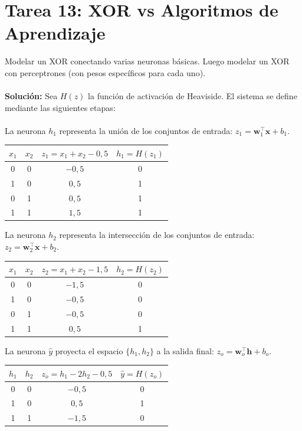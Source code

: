 \documentclass{article}
\begin{document}
\section{Tarea 13: XOR vs Algoritmos de Aprendizaje}
\noindent Modelar un XOR conectando varias neuronas básicas. Luego modelar un XOR con perceptrones (con pesos específicos para cada uno). \\ \\
\textbf{Solución:} Sea $H(z)$ la función de activación de Heaviside. El sistema se define mediante las siguientes etapas: \\ \\
La neurona $h_1$ representa la unión de los conjuntos de entrada: $z_1 = \mathbf{w}_1^\top \mathbf{x} + b_1$.
\begin{center}
\begin{tabular}{cccc}
\toprule
$x_1$ & $x_2$ & $z_1 = x_1 + x_2 - 0,5$ & $h_1 = H(z_1)$ \\
\midrule
0 & 0 & $-0,5$ & 0 \\
1 & 0 & $0,5$  & 1 \\
0 & 1 & $0,5$  & 1 \\
1 & 1 & $1,5$  & 1 \\
\bottomrule
\end{tabular}
\end{center}
La neurona $h_2$ representa la intersección de los conjuntos de entrada: $z_2 = \mathbf{w}_2^\top \mathbf{x} + b_2$.
\begin{center}
\begin{tabular}{cccc}
\toprule
$x_1$ & $x_2$ & $z_2 = x_1 + x_2 - 1,5$ & $h_2 = H(z_2)$ \\
\midrule
0 & 0 & $-1,5$ & 0 \\
1 & 0 & $-0,5$ & 0 \\
0 & 1 & $-0,5$ & 0 \\
1 & 1 & $0,5$  & 1 \\
\bottomrule
\end{tabular}
\end{center}
La neurona $\hat{y}$ proyecta el espacio $\{h_1, h_2\}$ a la salida final: $z_o = \mathbf{w}_o^\top \mathbf{h} + b_o$.
\begin{center}
\begin{tabular}{cccc}
\toprule
$h_1$ & $h_2$ & $z_o = h_1 - 2h_2 - 0,5$ & $\hat{y} = H(z_o)$ \\
\midrule
0 & 0 & $-0,5$ & 0 \\
1 & 0 & $0,5$  & 1 \\
1 & 1 & $-1,5$ & 0 \\
\bottomrule
\end{tabular}
\end{center}
\end{document}
